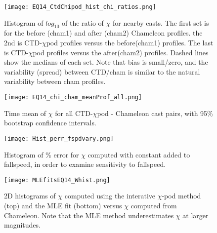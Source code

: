 \documentclass{ametsoc}
\begin{document}
\begin{figure}[t]
  \noindent\texttt{[image: EQ14\_CtdChipod\_hist\_chi\_ratios.png]}\\
  \caption{Histogram of $log_{10}$ of the ratio of $\chi$ for nearby casts. The first set is for the before (cham1) and after (cham2) Chameleon profiles. the 2nd is CTD-$\chi$pod profiles versus the before(cham1) profiles. The last is CTD-$\chi$pod profiles versus the after(cham2) profiles. Dashed lines show the medians of each set.  Note that bias is small/zero, and the variability (spread) between CTD/cham is similar to the natural variability between cham profiles.}
  \label{eq14_cdtChi_vs_cham_hist}
\end{figure}

\begin{figure}[t]
  \noindent\texttt{[image: EQ14\_chi\_cham\_meanProf\_all.png]}\\
  \caption{Time mean of $\chi$ for all CTD-$\chi$pod - Chameleon cast pairs, with 95\% bootstrap confidence intervals.}
  \label{ctd_cham_chi_boot_all}
\end{figure}


\begin{figure}[t]
  \noindent\texttt{[image: Hist\_perr\_fspdvary.png]}\\
  \caption{Histogram of \% error for $\chi$ computed with constant added to fallspeed, in order to examine sensitivity to fallspeed.}
  \label{FspdSensHist}
\end{figure}


\begin{figure}[t]
  \noindent\texttt{[image: MLEfitsEQ14\_Whist.png]}\\
  \caption{2D histograms of $\chi$ computed using the interative $\chi$-pod method (top) and the MLE fit (bottom) versus $\chi$ computed from Chameleon. Note that the MLE method underestimates $\chi$ at larger magnitudes.}
  \label{mlefits}
\end{figure}
\end{document}
